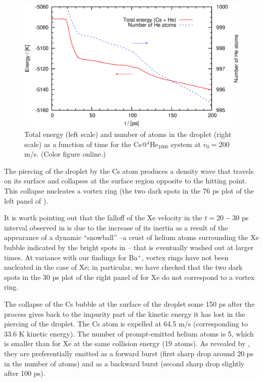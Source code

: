\begin{figure}[!]
\centerline{\includegraphics[width=0.90\linewidth,clip]{fig5}}
\caption{\label{fig5-headon} 
Total energy  (left scale) and number of atoms in the droplet (right scale) as a function of time for the 
Cs@$^4$He$_{1000}$ system at $v_0 = 200$ m/s. (Color figure online.)
}
\end{figure}

 The piercing of the droplet by the Cs atom produces a density wave that travels on its surface and collapses at the surface region opposite to the hitting point.
 This collapse nucleates a 
 vortex ring (the two dark spots in the 76 ps plot of the left panel of )\citep{Lea14a}.
 
 It is worth pointing out that the falloff of the Xe velocity in the $t=20-30$ ps interval observed in   is due to the increase of its inertia
as a result of the appearance of a dynamic ``snowball''  --a crust of helium atoms surrounding the Xe bubble indicated by the bright spots in 
-- that is eventually washed out at larger times.
At variance with our findings for Ba$^+$\citep{Mat14}, vortex rings have not been nucleated in the case of Xe; in particular, we have checked that the two dark spots  in the 30 ps plot of the right panel of  for Xe do not correspond to a vortex ring. 

The collapse of the Cs bubble at the surface of the droplet some 150 ps after the process 
 gives back to the impurity part of the kinetic energy it has lost  in the 
 piercing of the droplet. The Cs atom is expelled at 64.5 m/s (corresponding to 33.6 K kinetic energy). 
The number of prompt-emitted helium atoms is 5, which is smaller than for Xe at the same collision energy (19 atoms).
As revealed by , they are  preferentially emitted as a forward  burst  (first sharp drop around 20 ps in the number of atoms) and as a 
backward burst  (second sharp drop slightly after 100 ps).
\clearpage{\pagestyle{empty}\cleardoublepage}